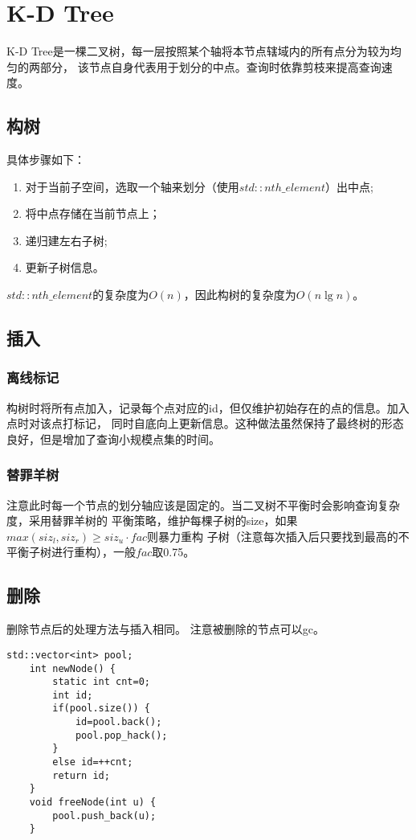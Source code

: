 \section{K-D Tree}
K-D Tree是一棵二叉树，每一层按照某个轴将本节点辖域内的所有点分为较为均匀的两部分，
该节点自身代表用于划分的中点。查询时依靠剪枝来提高查询速度。
\subsection{构树}
具体步骤如下：
\begin{enumerate}
	\item 对于当前子空间，选取一个轴来划分（使用$std::nth\_element$）出中点;
	\item 将中点存储在当前节点上；
	\item 递归建左右子树;
	\item 更新子树信息。
\end{enumerate}
$std::nth\_element$的复杂度为$O(n)$，因此构树的复杂度为$O(n\lg n)$。
\subsection{插入}
\subsubsection{离线标记}
构树时将所有点加入，记录每个点对应的id，但仅维护初始存在的点的信息。加入点时对该点打标记，
同时自底向上更新信息。这种做法虽然保持了最终树的形态良好，但是增加了查询小规模点集的时间。
\subsubsection{替罪羊树}
注意此时每一个节点的划分轴应该是固定的。当二叉树不平衡时会影响查询复杂度，采用替罪羊树的
平衡策略，维护每棵子树的size，如果$max(siz_l,siz_r)\geq siz_u \cdot fac$则暴力重构
子树（注意每次插入后只要找到最高的不平衡子树进行重构），一般$fac$取0.75。
\subsection{删除}
删除节点后的处理方法与插入相同。
注意被删除的节点可以gc。

\begin{lstlisting}[title=gc]
    std::vector<int> pool;
    int newNode() {
        static int cnt=0;
        int id;
        if(pool.size()) {
            id=pool.back();
            pool.pop_hack();
        }
        else id=++cnt;
        return id;
    }
    void freeNode(int u) {
        pool.push_back(u);
    }
\end{lstlisting}

